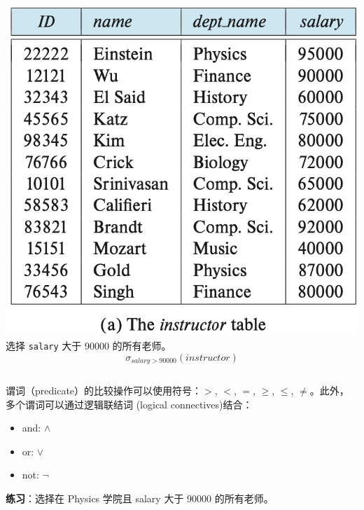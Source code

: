 \documentclass[aspectratio=169, 14pt]{beamer}
\begin{document}
\begin{frame}

	\begin{columns}
		\includegraphics[width=\textwidth]{table/instructor}
		\alert{选择} \texttt{salary} 大于 90000 的所有老师。
		\large{\[\sigma_{salary >  90000}(instructor)\]}
	\end{columns}

\end{frame}

\begin{frame}
	谓词（predicate）的比较操作可以使用符号：$>$, $<$, $=$, $\geq$, $\leq$, $\neq$。此外，多个谓词可以通过\alert{逻辑联结词} (logical connectives)结合：

	\begin{itemize}
		\item and: $\land$
		\item or: $\lor$
		\item not: $\neg$
	\end{itemize}

	\pause

	{\large {}} \textbf{练习}：选择在 Physics 学院且 salary 大于 90000 的所有老师。

\end{frame}
\end{document}
